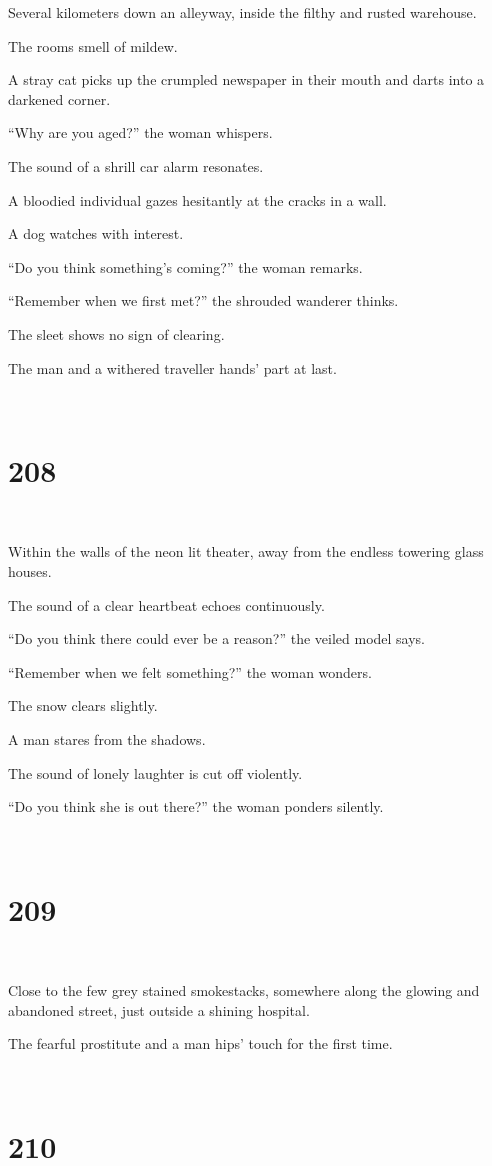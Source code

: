 \documentclass{report}
\begin{document}
Several kilometers down an alleyway, inside the filthy and rusted warehouse.

The rooms smell of mildew.

A stray cat picks up the crumpled newspaper in their mouth and darts into a darkened corner.

``Why are you aged?'' the woman whispers.

The sound of a shrill car alarm resonates.

A bloodied individual gazes hesitantly at the cracks in a wall.

A dog watches with interest.

``Do you think something's coming?'' the woman remarks.

``Remember when we first met?'' the shrouded wanderer thinks.

The sleet shows no sign of clearing.

The man and a withered traveller hands' part at last.

~
\chapter*{208}
~

Within the walls of the neon lit theater, away from the endless towering glass houses.

The sound of a clear heartbeat echoes continuously.

``Do you think there could ever be a reason?'' the veiled model says.

``Remember when we felt something?'' the woman wonders.

The snow clears slightly.

A man stares from the shadows.

The sound of lonely laughter is cut off violently.

``Do you think she is out there?'' the woman ponders silently.

~
\chapter*{209}
~

Close to the few grey stained smokestacks, somewhere along the glowing and abandoned street, just outside a shining hospital.

The fearful prostitute and a man hips' touch for the first time.

~
\chapter*{210}
~
\end{document}
